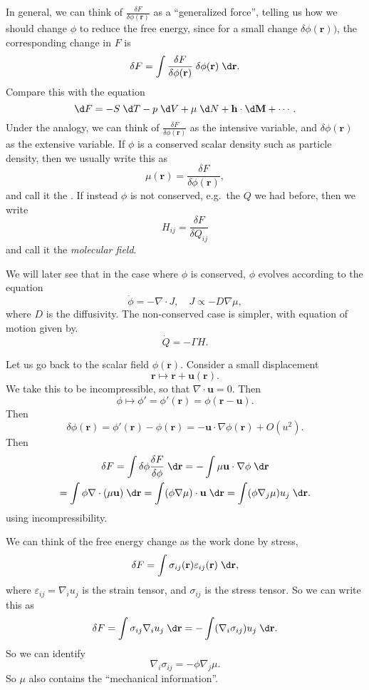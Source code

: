 \documentclass[a4paper]{article}
\begin{document}
In general, we can think of $\frac{\delta F}{\delta \phi(\mathbf{r})}$ as a ``generalized force'', telling us how we should change $\phi$ to reduce the free energy, since for a small change $\delta \phi(\mathbf{r}))$, the corresponding change in $F$ is
\[
  \delta F = \int \frac{\delta F}{\delta \phi(\mathbf{r})} \;\delta \phi(\mathbf{r})\;\d \mathbf{r}.
\]
Compare this with the equation
\[
  \d F = - S \;\d T - p \;\d V + \mu \;\d N + \mathbf{h} \cdot \d \mathbf{M} + \cdots.
\]
Under the analogy, we can think of $\frac{\delta F}{\delta \phi(\mathbf{r})}$ as the intensive variable, and $\delta \phi(\mathbf{r})$ as the extensive variable. If $\phi$ is a conserved scalar density such as particle density, then we usually write this as
\[
  \mu(\mathbf{r}) = \frac{\delta F}{\delta \phi(\mathbf{r})},
\]
and call it the . If instead $\phi$ is not conserved, e.g.\ the $Q$ we had before, then we write
\[
  H_{ij} = \frac{\delta F}{\delta Q_{ij}}
\]
and call it the \emph{molecular field}.

We will later see that in the case where $\phi$ is conserved, $\phi$ evolves according to the equation
\[
  \dot{\phi} = - \nabla \cdot J,\quad J \propto -D \nabla \mu,
\]
where $D$ is the diffusivity. The non-conserved case is simpler, with equation of motion given by.
\[
  \dot{Q} = - \Gamma H.
\]

Let us go back to the scalar field $\phi(\mathbf{r})$. Consider a small displacement
\[
  \mathbf{r} \mapsto \mathbf{r} + \mathbf{u}(\mathbf{r}).
\]
We take this to be incompressible, so that $\nabla \cdot \mathbf{u} = 0$. Then
\[
  \phi \mapsto \phi' = \phi'(\mathbf{r}) = \phi(\mathbf{r} - \mathbf{u}).
\]
Then
\[
  \delta \phi(\mathbf{r}) = \phi'(\mathbf{r}) - \phi(\mathbf{r}) = - \mathbf{u} \cdot \nabla \phi(\mathbf{r}) + O(u^2).
\]
Then
\begin{multline*}
  \delta F = \int \delta \phi \frac{\delta F}{\delta \phi}\;\d \mathbf{r}
  = -\int \mu \mathbf{u} \cdot \nabla \phi \;\d \mathbf{r}\\
  = \int \phi \nabla \cdot (\mu \mathbf{u})\;\d \mathbf{r}
  = \int (\phi \nabla \mu)\cdot \mathbf{u}\;\d \mathbf{r}
  = \int (\phi \nabla_j \mu)u_j\;\d \mathbf{r}.
\end{multline*}
using incompressibility.

We can think of the free energy change as the work done by stress,
\[
  \delta F = \int \sigma_{ij}(\mathbf{r}) \varepsilon_{ij}(\mathbf{r})\;\d \mathbf{r},
\]
where $\varepsilon_{ij} = \nabla_i u_j$ is the strain tensor, and $\sigma_{ij}$ is the stress tensor. So we can write this as
\[
  \delta F = \int \sigma_{ij} \nabla_i u_j\;\d \mathbf{r} = - \int (\nabla_i \sigma_{ij}) u_j\;\d \mathbf{r}.
\]
So we can identify
\[
  \nabla_i \sigma_{ij} = -\phi \nabla_j \mu.
\]
So $\mu$ also contains the ``mechanical information''.
\end{document}
